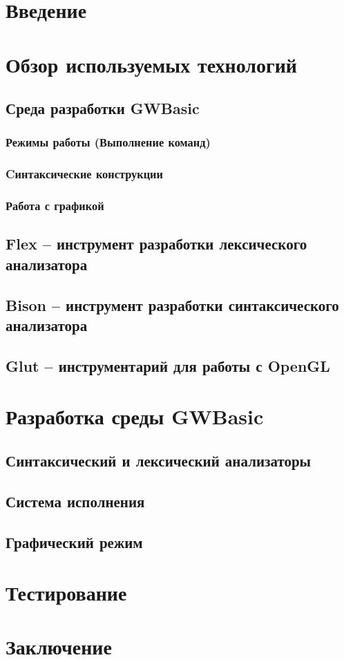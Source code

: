 \documentclass[12pt]{article}
\begin{document}
	\tableofcontents %
	
	\section{Введение}

	\section{Обзор используемых технологий}	
		\subsection{Среда разработки GWBasic}
			\subsubsection{Режимы работы (Выполнение команд)}
			\subsubsection{Cинтаксические конструкции}
			\subsubsection{Работа с графикой}
		\subsection{Flex -- инструмент разработки лексического анализатора}
		\subsection{Bison -- инструмент разработки синтаксического анализатора}
		\subsection{Glut -- инструментарий для работы с OpenGL}
	\section{Разработка среды GWBasic}
		\subsection{Синтаксический и лексический анализаторы}
		\subsection{Система исполнения}
		\subsection{Графический режим}
	\section{Тестирование}

	\section{Заключение}
	
\end{document}
